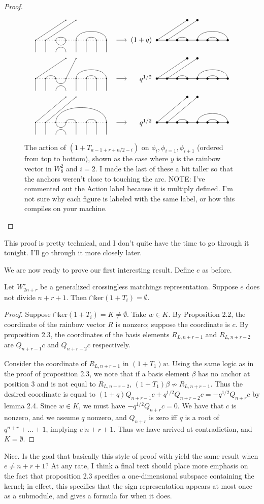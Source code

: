 \documentclass{amsart}
\begin{document}
\begin{proof}
	
	\begin{figure}
		\[
		\GeneralizedAction{8}{3/4,5/8,6/7}{2}{1/1,2/2}{1}{3}{3/4,5/8,6/7}{1/1,2/2}{(1+q)}
		\]
		\[
		\GeneralizedAction{8}{2/3,5/8,6/7}{2}{1/1,4/2}{1}{3}{3/4,5/8,6/7}{1/1,2/2}{q^{1/2}}
		\]
		\[
		\GeneralizedAction{8}{3/8,4/5,6/7}{2}{1/1,2/2}{1.25}{3}{3/4,5/8,6/7}{1/1,2/2}{q^{1/2}}
		\]
    \caption{The action of $(1+T_{a-1+r+n/2-i})$ on $\phi_i,\phi_{i=1},\phi_{i+1}$ (ordered from top to bottom), shown as the case where $y$ is the rainbow vector in $W_{8}^2$ and $i=2$.{\color{magenta} I made the last of these a bit taller so that the anchors weren't close to touching the arc.
    \LARGE NOTE: I've commented out the Action label because it is multiply defined.
    I'm not sure why each figure is labeled with the same label, or how this compiles on your machine.
  }
  }
	\end{figure}
\end{proof}	
{\color{magenta} This proof is pretty technical, and I don't quite have the time to go through it tonight. I'll go through it more closely later.}

We are now ready to prove our first interesting result. Define $e$ as before.

\begin{proposition}
	Let $W_{2n+r}^r$ be a generalized crossingless matchings representation. Suppose $e$ does not divide $n+r+1$. Then $\cap\text{ker}(1+T_i)=\emptyset$.
\end{proposition}

\begin{proof}
	Suppose $\cap\text{ker}(1+T_i)=K\not=\emptyset$. Take $w\in K$. By Proposition 2.2, the coordinate of the rainbow vector $R$ is nonzero; suppose the coordinate is $c$. By proposition 2.3, the coordinates of the basis elements $R_{L,n+r-1}$ and $R_{L,n+r-2}$ are $Q_{n+r-1}c$ and $Q_{n+r-2}c$ respectively.
	
	Consider the coordinate of $R_{L,n+r-1}$ in $(1+T_1)w$. Using the same logic as in the proof of proposition 2.3, we note that if a basis element $\beta$ has no anchor at position $3$ and is not equal to $R_{L,n+r-2}$, $(1+T_1)\beta\not\sim R_{L,n+r-1}$. Thus the desired coordinate is equal to $(1+q)Q_{n+r-1}c+q^{1/2}Q_{n+r-2}c=-q^{1/2}Q_{n+r}c$ by lemma 2.4. Since $w\in K$, we must have $-q^{1/2}Q_{n+r}c=0$. We have that $c$ is nonzero, and we assume $q$ nonzero, and $Q_{n+r}$ is zero iff $q$ is a root of $q^{n+r}+...+1$, implying $e|n+r+1$. Thus we have arrived at contradiction, and $K=\emptyset$.
\end{proof}
{\color{magenta} Nice. Is the goal that basically this style of proof with yield the same result when $e \neq n + r + 1$? At any rate, I think a final text should place more emphasis on the fact that proposition 2.3 specifies a one-dimensional subspace containing the kernel;
in effect, this specifies that the sign representation appears at most once as a submodule, and gives a formula for when it does.}
\end{document}
